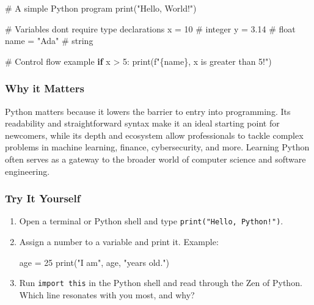 \documentclass[
  letterpaper,
  DIV=11,
  numbers=noendperiod]{scrreprt}
\newenvironment{Shaded}{\begin{snugshade}}{\end{snugshade}}
\newcommand{\BuiltInTok}[1]{\textcolor[rgb]{0.00,0.23,0.31}{#1}}
\newcommand{\CommentTok}[1]{\textcolor[rgb]{0.37,0.37,0.37}{#1}}
\newcommand{\ControlFlowTok}[1]{\textcolor[rgb]{0.00,0.23,0.31}{\textbf{#1}}}
\newcommand{\DecValTok}[1]{\textcolor[rgb]{0.68,0.00,0.00}{#1}}
\newcommand{\FloatTok}[1]{\textcolor[rgb]{0.68,0.00,0.00}{#1}}
\newcommand{\NormalTok}[1]{\textcolor[rgb]{0.00,0.23,0.31}{#1}}
\newcommand{\OperatorTok}[1]{\textcolor[rgb]{0.37,0.37,0.37}{#1}}
\newcommand{\SpecialCharTok}[1]{\textcolor[rgb]{0.37,0.37,0.37}{#1}}
\newcommand{\SpecialStringTok}[1]{\textcolor[rgb]{0.13,0.47,0.30}{#1}}
\newcommand{\StringTok}[1]{\textcolor[rgb]{0.13,0.47,0.30}{#1}}
\begin{document}
\begin{Shaded}
\begin{Highlighting}[]
\CommentTok{\# A simple Python program}
\BuiltInTok{print}\NormalTok{(}\StringTok{"Hello, World!"}\NormalTok{)}

\CommentTok{\# Variables don\textquotesingle{}t require type declarations}
\NormalTok{x }\OperatorTok{=} \DecValTok{10}       \CommentTok{\# integer}
\NormalTok{y }\OperatorTok{=} \FloatTok{3.14}     \CommentTok{\# float}
\NormalTok{name }\OperatorTok{=} \StringTok{"Ada"} \CommentTok{\# string}

\CommentTok{\# Control flow example}
\ControlFlowTok{if}\NormalTok{ x }\OperatorTok{\textgreater{}} \DecValTok{5}\NormalTok{:}
    \BuiltInTok{print}\NormalTok{(}\SpecialStringTok{f"}\SpecialCharTok{\{}\NormalTok{name}\SpecialCharTok{\}}\SpecialStringTok{, x is greater than 5!"}\NormalTok{)}
\end{Highlighting}
\end{Shaded}

\subsubsection{Why it Matters}\label{why-it-matters}

Python matters because it lowers the barrier to entry into programming.
Its readability and straightforward syntax make it an ideal starting
point for newcomers, while its depth and ecosystem allow professionals
to tackle complex problems in machine learning, finance, cybersecurity,
and more. Learning Python often serves as a gateway to the broader world
of computer science and software engineering.

\subsubsection{Try It Yourself}\label{try-it-yourself}

\begin{enumerate}
\def\labelenumi{\arabic{enumi}.}
\item
  Open a terminal or Python shell and type
  \texttt{print("Hello,\ Python!")}.
\item
  Assign a number to a variable and print it. Example:

\begin{Shaded}
\begin{Highlighting}[]
\NormalTok{age }\OperatorTok{=} \DecValTok{25}
\BuiltInTok{print}\NormalTok{(}\StringTok{"I am"}\NormalTok{, age, }\StringTok{"years old."}\NormalTok{)}
\end{Highlighting}
\end{Shaded}
\item
  Run \texttt{import\ this} in the Python shell and read through the Zen
  of Python. Which line resonates with you most, and why?
\end{enumerate}
\end{document}
